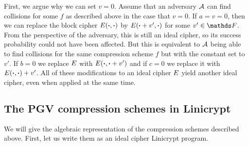 First, we argue why we can set $v=0$.
Assume that an adversary $\mathcal{A}$ can find collisions for some $f$ as described above in the case that $v=0$.
If $a = v = 0$, then we can replace the block cipher $E(\boldsymbol\cdot, \boldsymbol\cdot)$ by $E(\boldsymbol\cdot + v', \boldsymbol\cdot)$ for some $v' \in \F$.
From the perspective of the adversary,
this is still an ideal cipher,
so its success probability could not have been affected.
But this is equivalent to $\mathcal{A}$ being able to find collisions for the same compression scheme $f$ but with the constant set to $v'$.
If $b=0$ we replace $E$ with $E(\boldsymbol\cdot, \boldsymbol\cdot + v')$ and if $c=0$ we replace it with $E(\boldsymbol\cdot, \boldsymbol\cdot) + v'$.
All of these modifications to an ideal cipher $E$ yield another ideal cipher,
even when applied at the same time.

\subsection{The PGV compression schemes in Linicrypt}
We will give the algebraic representation of the compression schemes described above.
First, let us write them as an ideal cipher Linicrypt program. 

